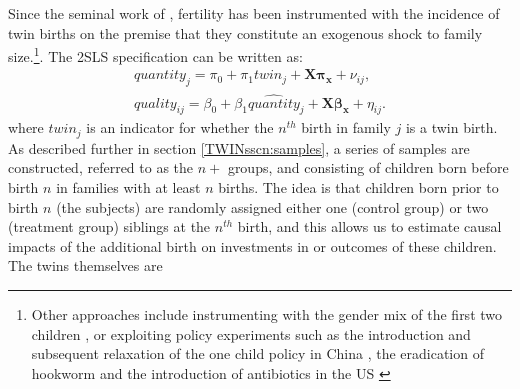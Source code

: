\documentclass[subeqn]{article}
\begin{document}
\begin{spacing}{1.4}
Since the seminal work of \citep{RosenzweigWolpin1980}, fertility has been instrumented with the incidence of twin 
births on the premise that they constitute an exogenous shock to family size.\footnote{Other approaches include instrumenting with the gender mix of the first two children \citep{AngristEvans1998,ConleyGlauber2006}, or exploiting policy experiments such as the introduction and subsequent relaxation of the one child policy in China
  \citep{Qian2009,ArgysAverett2015}, the eradication of hookworm \citep{BleakleyLange2009} and the introduction of antibiotics in the US \citep{Bhalotraetal2016}}.
The 2SLS specification can be written as:
\begin{subequations}
  \begin{eqnarray}
    \label{TWINeqn:IV1}
    quantity_{j}=\pi_0+\pi_1 twin_{j} + \bm{X}\bm{\pi_x}+\nu_{ij}, \\ \label{TWINeqn:IV2}
    quality_{ij}=\beta_0 + \beta_1 \widehat{quantity}_j + \bm{X}\bm{\beta_x}+\eta_{ij}.
  \end{eqnarray}
\end{subequations}
where $twin_j$ is an indicator for whether the $n^{th}$ birth in family $j$ is a
twin birth. As described further in section \ref{TWINsscn:samples}, a series of samples
are constructed, referred to as the $n+$ groups, and consisting of children born before
birth $n$ in families with at least $n$ births. The idea is that children born prior to birth $n$ (the subjects) are randomly assigned either one (control group) or two
(treatment group) siblings at the $n^{th}$ birth, and this allows us to estimate causal impacts of the additional birth on investments in or outcomes of these children. The twins themselves are

\end{spacing}
\end{document}

